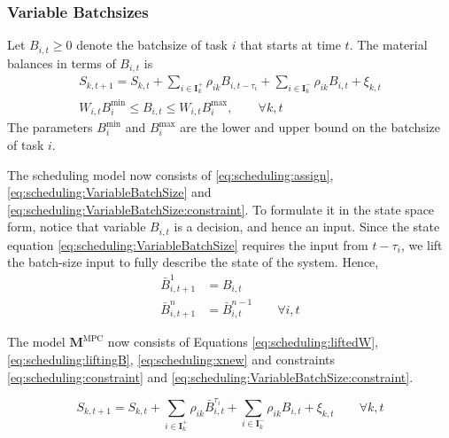 \subsubsection{Variable Batchsizes}
Let  $B_{i,t} \geq 0$  denote the batchsize of task $i$
that starts at time $t$. The material balances in terms of $B_{i,t}$ is
\begin{gather}
\label{eq:scheduling:VariableBatchSize}
S_{k,t+1} = S_{k,t}+ \sum_{i\in \mathbf{I}_k^+}\rho_{ik}B_{i,t-\tau_i}
+ \sum_{i \in \mathbf{I}_k^-}\rho_{ik}B_{i,t} + \xi_{k,t} \\
\label{eq:scheduling:VariableBatchSize:constraint}
W_{i,t}B^{\text{min}}_{i} \leq B_{i,t} \leq
W_{i,t}B^{\text{max}}_{i}, \qquad \forall k,t
\end{gather}
The parameters $B^{\text{min}}_{i}$ and $B^{\text{max}}_{i}$ are the
lower and upper bound on the batchsize of task $i$.

The scheduling model now consists of \eqref{eq:scheduling:assign},
\eqref{eq:scheduling:VariableBatchSize} and
\eqref{eq:scheduling:VariableBatchSize:constraint}. To formulate it in
the state space form, notice that variable $B_{i,t}$ is a decision,
and hence an input. Since the state equation
\eqref{eq:scheduling:VariableBatchSize} requires the input from
$t-\tau_i$, we lift the batch-size input to fully describe the state
of the system. Hence,
\begin{align}
\bar{B}_{i,t+1}^{1} & = B_{i,t} \\
\label{eq:scheduling:liftingB}
\bar{B}_{i,t+1}^{n} & = \bar{B}_{i,t}^{n-1} \qquad \forall i,t 
\end{align}

The model $\mathbf{M}^{\text{MPC}}$ now consists of Equations
\eqref{eq:scheduling:liftedW}, \eqref{eq:scheduling:liftingB},
\eqref{eq:scheduling:xnew} and constraints
\eqref{eq:scheduling:constraint} and
\eqref{eq:scheduling:VariableBatchSize:constraint}.

\begin{equation}
\label{eq:scheduling:xnew}
S_{k,t+1} = S_{k,t} + \sum_{i\in
  \mathbf{I}_k^+}\rho_{ik}\bar{B}^{\tau_i}_{i,t}+ \sum_{i\in
  \mathbf{I}_k^-}\rho_{ik}B_{i,t}+ \xi_{k,t} \qquad \forall k,t
\end{equation}


